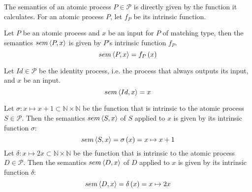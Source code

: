 
The semantics of an atomic process $P \in \mathcal{P}$ is directly given by the function it calculates. For an atomic process $P$, let $f_P$ be its intrinsic function. 
\begin{definition}
  \label{def:sem_atomic}
  Let $P$ be an atomic process and $x$ be an input for $P$ of matching type, then the semantics $sem \left\langle P, x \right\rangle$ is given by $P$'s intrinsic function $f_P$.
  \begin{equation}
    \label{eqn:sem_atomic}
    sem \left\langle P, x \right\rangle = f_P \left( x \right)
  \end{equation}
  \hfill\qedsymbol
\end{definition}



\begin{definition}
\label{def:sem_id}
Let $Id \in \mathcal{P}$ be the identity process, i.e. the process that always outputs its input, and $x$ be an input.
\begin{equation}
  \label{eqn:sem_id}
  sem \left\langle Id, x \right\rangle = x
\end{equation}
\hfill\qedsymbol
\end{definition}


\begin{example}
  \label{exp:sem_atomic}
  Let $\sigma \colon x \mapsto x+1 \subset \mathbb{N} \times \mathbb{N}$ be the function that is intrinsic to the atomic process $S \in \mathcal{P}$. Then the semantics $sem \left\langle S, x \right\rangle$ of $S$ applied to $x$ is given by its intrinsic function $\sigma$:
  \begin{equation}
    sem \left\langle S, x \right\rangle = \sigma \left( x \right) = x \mapsto x+1
  \end{equation}
  Let $\delta \colon x \mapsto 2x \subset \mathbb{N} \times \mathbb{N}$ be the function that is intrinsic to the atomic process $D \in \mathcal{P}$. Then the semantics $sem \left\langle D, x \right\rangle$ of $D$ applied to $x$ is given by its intrinsic function $\delta$:
  \begin{equation}
    sem \left\langle D, x \right\rangle = \delta \left( x \right) = x \mapsto 2x
  \end{equation}
  \hfill\qedsymbol
\end{example}


